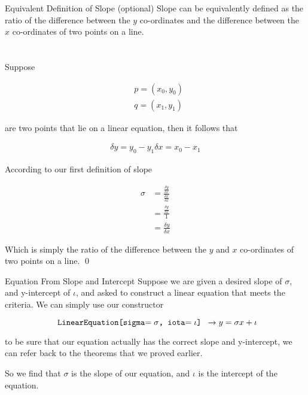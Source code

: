 \documentclass{book}
\begin{document}
  {\theorem Equivalent Definition of Slope (optional)  
    Slope can be equivalently defined as the ratio of the difference between the $y$ co-ordinates and the difference between the $x$ co-ordinates of two points on a line.\\\\

    \proof\\
    Suppose

    \begin{align*}
      & p = (x_0, y_0)\\
      & q = (x_1, y_1)
    \end{align*}

    are two points that lie on a linear equation, then it follows that

    \begin{align*}
      \delta y = y_0 - y_1
      \delta x = x_0 - x_1
    \end{align*}

    According to our first definition of slope

    \begin{align*}
      \sigma & = \frac{\frac{\delta y}{\delta x}}{\frac{\delta x}{\delta x}}\\
      & = \frac{\frac{\delta y}{\delta x}}{1}\\
      & = \frac{\delta y}{\delta x}
    \end{align*}

    Which is simply the ratio of the difference between the $y$ and $x$ co-ordinates of two points on a line. \qed
  }

  {\remark Equation From Slope and Intercept
    Suppose we are given a desired slope of $\sigma$, and y-intercept of $\iota$, and asked to construct a linear equation that meets the criteria. We can simply use our constructor

    $$\text{\texttt{ LinearEquation[sigma$= {\sigma}$, iota$= {\iota}$] }}\to y = {\sigma}x + {\iota}$$

    to be sure that our equation actually has the correct slope and y-intercept, we can refer back to the theorems that we proved earlier.

    So we find that $\sigma$ is the slope of our equation, and $\iota$ is the intercept of the equation.
  }
\end{document}
